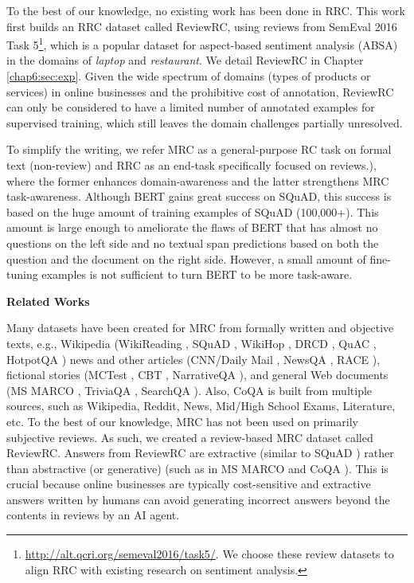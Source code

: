 To the best of our knowledge, no existing work has been done in RRC. This work first builds an RRC dataset called ReviewRC, using reviews from SemEval 2016 Task 5\footnote{\url{http://alt.qcri.org/semeval2016/task5/}. We choose these review datasets to align RRC with existing research on sentiment analysis.}, which is a popular dataset for aspect-based sentiment analysis (ABSA) \cite{hu2004mining} in the domains of \emph{laptop} and \emph{restaurant}.
We detail ReviewRC in Chapter \ref{chap6:sec:exp}.
Given the wide spectrum of domains (types of products or services) in online businesses and the prohibitive cost of annotation, ReviewRC can only be considered to have a limited number of annotated examples for supervised training, which still leaves the domain challenges partially unresolved.

To simplify the writing, we refer MRC as a general-purpose RC task on formal text (non-review) and RRC as an end-task specifically focused on reviews.), where the former enhances domain-awareness and the latter strengthens MRC task-awareness.
Although BERT gains great success on SQuAD, this success is based on the huge amount of training examples of SQuAD (100,000+).
This amount is large enough to ameliorate the flaws of BERT that has almost no questions on the left side and no textual span predictions based on both the question and the document on the right side.
However, a small amount of fine-tuning examples is not sufficient to turn BERT to be more task-aware.

\textbf{Related Works}

Many datasets have been created for MRC from formally written and objective texts, e.g., Wikipedia (WikiReading \cite{hewlett2016wikireading}, SQuAD \cite{rajpurkar2016squad,rajpurkar2018know}, WikiHop \cite{welbl2018constructing}, DRCD \cite{shao2018drcd}, QuAC \cite{choi2018quac}, HotpotQA \cite{yang2018hotpotqa}) news and other articles (CNN/Daily Mail \cite{hermann2015teaching}, NewsQA \cite{trischler2016newsqa}, RACE \cite{lai2017race}), fictional stories (MCTest \cite{richardson2013mctest}, CBT \cite{hill2015goldilocks}, NarrativeQA \cite{kovcisky2018narrativeqa}), and general Web documents (MS MARCO \cite{nguyen2016ms}, TriviaQA \cite{joshi2017triviaqa}, SearchQA \cite{dunn2017searchqa} ). 
Also, CoQA \cite{reddy2018coqa} is built from multiple sources, such as Wikipedia, Reddit, News, Mid/High School Exams, Literature, etc.
To the best of our knowledge, MRC has not been used on primarily subjective reviews. As such, we created a review-based MRC dataset called ReviewRC.
Answers from ReviewRC are extractive (similar to SQuAD \cite{rajpurkar2016squad,rajpurkar2018know}) rather than abstractive (or generative) (such as in MS MARCO \cite{nguyen2016ms} and CoQA \cite{reddy2018coqa}).
This is crucial because online businesses are typically cost-sensitive and extractive answers written by humans can avoid generating incorrect answers beyond the contents in reviews by an AI agent.


